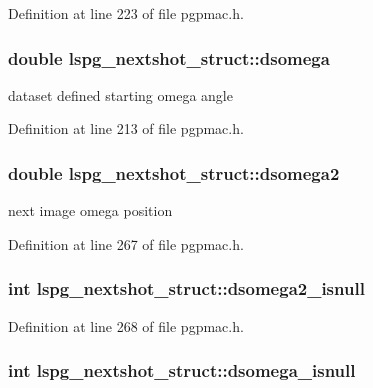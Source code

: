 Definition at line 223 of file pgpmac.\-h.

\hypertarget{structlspg__nextshot__struct_a4be525bb32fb0232c21a91529f1e8c73}{
\subsubsection[{dsomega}]{\setlength{\rightskip}{0pt plus 5cm}double lspg\-\_\-nextshot\-\_\-struct\-::dsomega}}\label{structlspg__nextshot__struct_a4be525bb32fb0232c21a91529f1e8c73}


dataset defined starting omega angle 



Definition at line 213 of file pgpmac.\-h.

\hypertarget{structlspg__nextshot__struct_a84ae35abfa725d1bdbff5403f6384ee4}{
\subsubsection[{dsomega2}]{\setlength{\rightskip}{0pt plus 5cm}double lspg\-\_\-nextshot\-\_\-struct\-::dsomega2}}\label{structlspg__nextshot__struct_a84ae35abfa725d1bdbff5403f6384ee4}


next image omega position 



Definition at line 267 of file pgpmac.\-h.

\hypertarget{structlspg__nextshot__struct_afaf9bdf89a68e7f479969072643e55eb}{
\subsubsection[{dsomega2\-\_\-isnull}]{\setlength{\rightskip}{0pt plus 5cm}int lspg\-\_\-nextshot\-\_\-struct\-::dsomega2\-\_\-isnull}}\label{structlspg__nextshot__struct_afaf9bdf89a68e7f479969072643e55eb}


Definition at line 268 of file pgpmac.\-h.

\hypertarget{structlspg__nextshot__struct_ad1da3548dc642d415aed53dc165c44fc}{
\subsubsection[{dsomega\-\_\-isnull}]{\setlength{\rightskip}{0pt plus 5cm}int lspg\-\_\-nextshot\-\_\-struct\-::dsomega\-\_\-isnull}}\label{structlspg__nextshot__struct_ad1da3548dc642d415aed53dc165c44fc}



